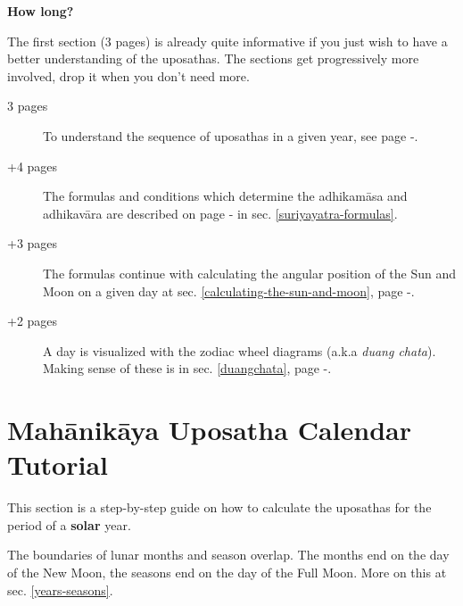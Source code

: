 \documentclass[11pt,oneside]{memoir-article}
\begin{document}
\vspace*{\baselineskip}

{\centering\large\bfseries
How long?
\par}

The first section (3 pages) is already quite informative if you just wish to
have a better understanding of the uposathas. The sections get progressively
more involved, drop it when you don't need more.

{\raggedright

\begin{description}
\item[{3 pages}] To understand the sequence of uposathas in a given year, see
page \pageref{uposatha-tutorial}-\pageref{uposatha-tutorial-end}.
\item[{+4 pages}] The formulas and conditions which determine the adhikamāsa and
adhikavāra are described on page \pageref{suriyayatra-formulas}-\pageref{adhikavara-years-end} in
sec. \ref{suriyayatra-formulas}.
\item[{+3 pages}] The formulas continue with calculating the angular position
of the Sun and Moon on a given day at sec. \ref{calculating-the-sun-and-moon}, page
\pageref{calculating-the-sun-and-moon}-\pageref{calculating-the-sun-and-moon-end}.
\item[{+2 pages}] A day is visualized with the zodiac wheel diagrams (a.k.a \emph{duang chata}).
Making sense of these is in sec. \ref{duangchata}, page \pageref{duangchata}-\pageref{duangchata-end}.
\end{description}

}

%

\clearpage

\enlargethispage{2\baselineskip}

\tableofcontents*

\clearpage

\chapter{Mahānikāya Uposatha Calendar Tutorial}
\label{sec-1}
\label{uposatha-tutorial}

This section is a step-by-step guide on how to calculate the uposathas for the
period of a \textbf{solar} year.

The boundaries of lunar months and season overlap. The months end on the day of
the New Moon, the seasons end on the day of the Full Moon. More on this at sec.
\ref{years-seasons}.
\end{document}
